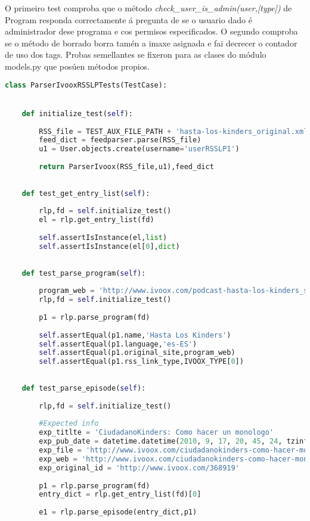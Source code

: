 O primeiro test comproba que o método \textit{check\_user\_is\_admin(user,[type])} de Program responda correctamente á pregunta de se o usuario dado é administrador dese programa e cos permisos especificados. O segundo comproba se o método de borrado borra tamén a imaxe asignada e fai decrecer o contador de uso dos tags. Probas semellantes se fixeron para as clases do módulo models.py que posúen métodos propios.


\begin{lstlisting}[language=Python, caption=Probas de unidade dos metodos de ParserIvoox, label=lst:ivooxtest]
class ParserIvooxRSSLPTests(TestCase):


	def initialize_test(self):
	
		RSS_file = TEST_AUX_FILE_PATH + 'hasta-los-kinders_original.xml'
		feed_dict = feedparser.parse(RSS_file)
		u1 = User.objects.create(username='userRSSLP1')
		
		return ParserIvoox(RSS_file,u1),feed_dict
	
	
	def test_get_entry_list(self):
	
		rlp,fd = self.initialize_test()
		el = rlp.get_entry_list(fd)
		
		self.assertIsInstance(el,list)
		self.assertIsInstance(el[0],dict)
	
	
	def test_parse_program(self):
	
		program_web = 'http://www.ivoox.com/podcast-hasta-los-kinders_sq_f14062_1.html'
		rlp,fd = self.initialize_test()
		
		p1 = rlp.parse_program(fd)
		
		self.assertEqual(p1.name,'Hasta Los Kinders')
		self.assertEqual(p1.language,'es-ES')
		self.assertEqual(p1.original_site,program_web)
		self.assertEqual(p1.rss_link_type,IVOOX_TYPE[0])
	
	
	def test_parse_episode(self):
	
		rlp,fd = self.initialize_test()
		
		#Expected info
		exp_titlte = 'CiudadanoKinders: Como hacer un monologo'
		exp_pub_date = datetime.datetime(2010, 9, 17, 20, 45, 24, tzinfo=pytz.utc)
		exp_file = 'http://www.ivoox.com/ciudadanokinders-como-hacer-monologo_mf_368919_feed_1.mp3'
		exp_web = 'http://www.ivoox.com/ciudadanokinders-como-hacer-monologo-audios-mp3_rf_368919_1.html'
		exp_original_id = 'http://www.ivoox.com/368919'
		
		p1 = rlp.parse_program(fd)
		entry_dict = rlp.get_entry_list(fd)[0]
		
		e1 = rlp.parse_episode(entry_dict,p1)
		

\end{lstlisting}
